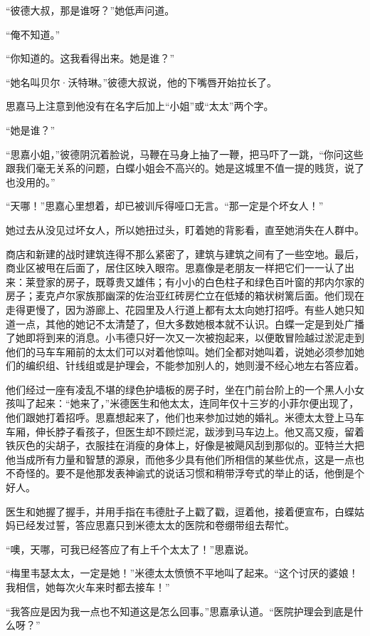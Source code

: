 \par “彼德大叔，那是谁呀？”她低声问道。
\par “俺不知道。”
\par “你知道的。这我看得出来。她是谁？”
\par “她名叫贝尔·沃特琳。”彼德大叔说，他的下嘴唇开始拉长了。
\par 思嘉马上注意到他没有在名字后加上“小姐”或“太太”两个字。
\par “她是谁？”
\par “思嘉小姐，”彼德阴沉着脸说，马鞭在马身上抽了一鞭，把马吓了一跳，“你问这些跟我们毫无关系的问题，白蝶小姐会不高兴的。她是这城里不值一提的贱货，说了也没用的。”
\par “天哪！”思嘉心里想着，却已被训斥得哑口无言。“那一定是个坏女人！”
\par 她过去从没见过坏女人，所以她扭过头，盯着她的背影看，直至她消失在人群中。
\par 商店和新建的战时建筑连得不那么紧密了，建筑与建筑之间有了一些空地。最后，商业区被甩在后面了，居住区映入眼帘。思嘉像是老朋友一样把它们一一认了出来：莱登家的房子，既尊贵又雄伟；有小小的白色柱子和绿色百叶窗的邦内尔家的房子；麦克卢尔家族那幽深的佐治亚红砖房伫立在低矮的箱状树篱后面。他们现在走得更慢了，因为游廊上、花园里及人行道上都有太太向她打招呼。有些人她只知道一点，其他的她记不太清楚了，但大多数她根本就不认识。白蝶一定是到处广播了她即将到来的消息。小韦德只好一次又一次被抱起来，以便敢冒险越过淤泥走到他们的马车车厢前的太太们可以对着他惊叫。她们全都对她叫着，说她必须参加她们的编织组、针线组或是护理会，不能参加别人的，她则漫不经心地左右答应着。
\par 他们经过一座有凌乱不堪的绿色护墙板的房子时，坐在门前台阶上的一个黑人小女孩叫了起来：“她来了，”米德医生和他太太，连同年仅十三岁的小菲尔便出现了，他们跟她打着招呼。思嘉想起来了，他们也来参加过她的婚礼。米德太太登上马车车厢，伸长脖子看孩子，但医生却不顾烂泥，跋涉到马车边上。他又高又瘦，留着铁灰色的尖胡子，衣服挂在消瘦的身体上，好像是被飓风刮到那似的。亚特兰大把他当成所有力量和智慧的源泉，而他多少具有他们所相信的某些优点，这是一点也不奇怪的。要不是他那发表神谕式的说话习惯和稍带浮夸式的举止的话，他倒是个好人。
\par 医生和她握了握手，并用手指在韦德肚子上戳了戳，逗着他，接着便宣布，白蝶姑妈已经发过誓，答应思嘉只到米德太太的医院和卷绷带组去帮忙。
\par “噢，天哪，可我已经答应了有上千个太太了！”思嘉说。
\par “梅里韦瑟太太，一定是她！”米德太太愤愤不平地叫了起来。“这个讨厌的婆娘！我相信，她每次火车来时都去接车！”
\par “我答应是因为我一点也不知道这是怎么回事。”思嘉承认道。“医院护理会到底是什么呀？”
